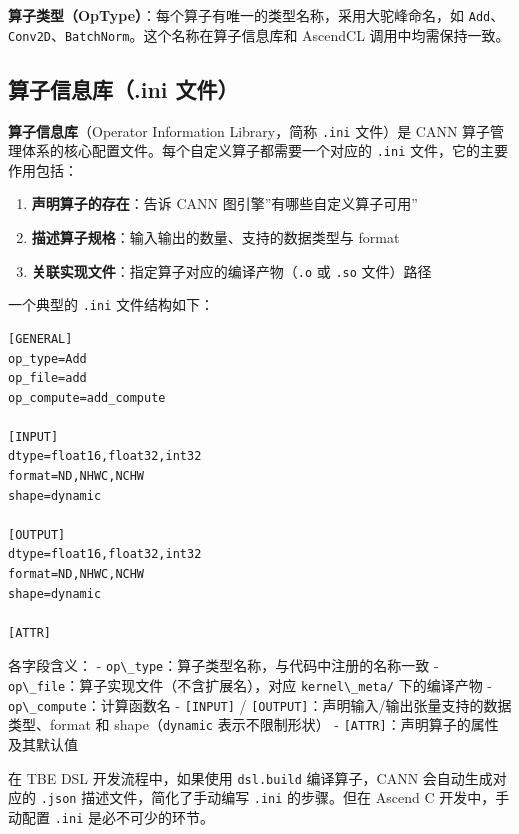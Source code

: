 \textbf{算子类型（OpType）}：每个算子有唯一的类型名称，采用大驼峰命名，如
\passthrough{\lstinline!Add!}、\passthrough{\lstinline!Conv2D!}、\passthrough{\lstinline!BatchNorm!}。这个名称在算子信息库和
AscendCL 调用中均需保持一致。

\subsection{算子信息库（.ini 文件）}\label{src-book-chapter7-h36}

\textbf{算子信息库}（Operator Information Library，简称
\passthrough{\lstinline!.ini!} 文件）是 CANN
算子管理体系的核心配置文件。每个自定义算子都需要一个对应的
\passthrough{\lstinline!.ini!} 文件，它的主要作用包括：

\begin{enumerate}
\def\labelenumi{\arabic{enumi}.}
\tightlist
\item
  \textbf{声明算子的存在}：告诉 CANN 图引擎''有哪些自定义算子可用''
\item
  \textbf{描述算子规格}：输入输出的数量、支持的数据类型与 format
\item
  \textbf{关联实现文件}：指定算子对应的编译产物（\passthrough{\lstinline!.o!}
  或 \passthrough{\lstinline!.so!} 文件）路径
\end{enumerate}

一个典型的 \passthrough{\lstinline!.ini!} 文件结构如下：

\begin{lstlisting}
[GENERAL]
op_type=Add
op_file=add
op_compute=add_compute

[INPUT]
dtype=float16,float32,int32
format=ND,NHWC,NCHW
shape=dynamic

[OUTPUT]
dtype=float16,float32,int32
format=ND,NHWC,NCHW
shape=dynamic

[ATTR]
\end{lstlisting}

各字段含义： -
\passthrough{\lstinline!op\_type!}：算子类型名称，与代码中注册的名称一致
- \passthrough{\lstinline!op\_file!}：算子实现文件（不含扩展名），对应
\passthrough{\lstinline!kernel\_meta/!} 下的编译产物 -
\passthrough{\lstinline!op\_compute!}：计算函数名 -
\passthrough{\lstinline![INPUT]!} /
\passthrough{\lstinline![OUTPUT]!}：声明输入/输出张量支持的数据类型、format
和 shape（\passthrough{\lstinline!dynamic!} 表示不限制形状） -
\passthrough{\lstinline![ATTR]!}：声明算子的属性及其默认值

在 TBE DSL 开发流程中，如果使用 \passthrough{\lstinline!dsl.build!}
编译算子，CANN 会自动生成对应的 \passthrough{\lstinline!.json!}
描述文件，简化了手动编写 \passthrough{\lstinline!.ini!} 的步骤。但在
Ascend C 开发中，手动配置 \passthrough{\lstinline!.ini!}
是必不可少的环节。

